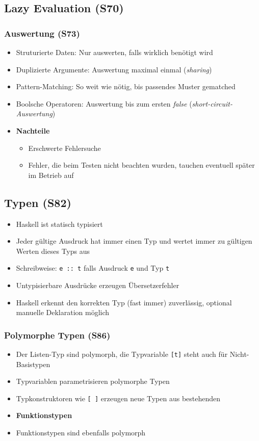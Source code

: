 \subsection{Lazy Evaluation (S70)}

\subsubsection{Auswertung (S73)}
\begin{itemize}
	\item Struturierte Daten: Nur auswerten, falls wirklich benötigt wird
	\item Duplizierte Argumente: Auswertung maximal einmal (\textit{sharing})
	\item Pattern-Matching: So weit wie nötig, bis passendes Muster gematched
	\item Boolsche Operatoren: Auswertung bis zum ersten \textit{false} (\textit{short-circuit-Auswertung})
	\item \textbf{Nachteile}
	\begin{itemize}
		\item Erschwerte Fehlersuche
		\item Fehler, die beim Testen nicht beachten wurden, tauchen eventuell später im Betrieb auf
	\end{itemize}
\end{itemize}


\subsection{Typen (S82)}
\begin{itemize}
	\item Haskell ist statisch typisiert
	\item Jeder gültige Ausdruck hat immer einen Typ und wertet immer zu gültigen Werten dieses Typs aus
	\item Schreibweise: \texttt{e :: t} falls Ausdruck \texttt{e} und Typ \texttt{t}
	\item Untypisierbare Ausdrücke erzeugen Übersetzerfehler
	\item Haskell erkennt den korrekten Typ (fast immer) zuverlässig, optional manuelle Deklaration möglich
\end{itemize}

\subsubsection{Polymorphe Typen (S86)}
\begin{itemize}
	\item Der Listen-Typ sind polymorph, die Typvariable \texttt{{[}t{]}} steht auch für Nicht-Basistypen
	\item Typvariablen parametrisieren polymorphe Typen
	\item Typkonstruktoren wie \texttt{{[} {]}} erzeugen neue Typen aus bestehenden
	\item \textbf{Funktionstypen}
	\item Funktionstypen sind ebenfalls polymorph
\end{itemize}

